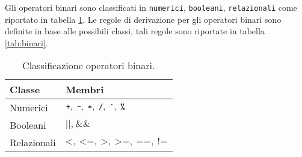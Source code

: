 \begin{table}[]
\caption{Regole di derivazione per gli operatori unari.}
\label{tab:unari}
\end{table}

Gli operatori binari sono classificati in \texttt{numerici}, \texttt{booleani}, \texttt{relazionali} come riportato in tabella \ref{tab:tipoOpBinari}. Le regole di derivazione per gli operatori binari sono definite in base alle possibili classi, tali regole sono riportate in tabella \ref{tab:binari}.

\begin{table}[]
\begin{tabular}{l|l}
Classe & Membri \\ \hline
Numerici & $\texttt{+},\ \texttt{-},\ \texttt{*},\ \texttt{/},\ \texttt{\^{}},\ \texttt{\%}$\\
Booleani & $\texttt{||},\ \texttt{\&\&}$ \\
Relazionali &$\texttt{<},\ \texttt{<=},\ \texttt{>},\ \texttt{>=},\ \texttt{==},\ \texttt{!=} $ \\
\end{tabular}
\caption{Classificazione operatori binari.}
\label{tab:tipoOpBinari}
\end{table}

\begin{table}[]
\caption{Regole di derivazione per gli operatori binari.}
\label{tab:binari}
\end{table}

